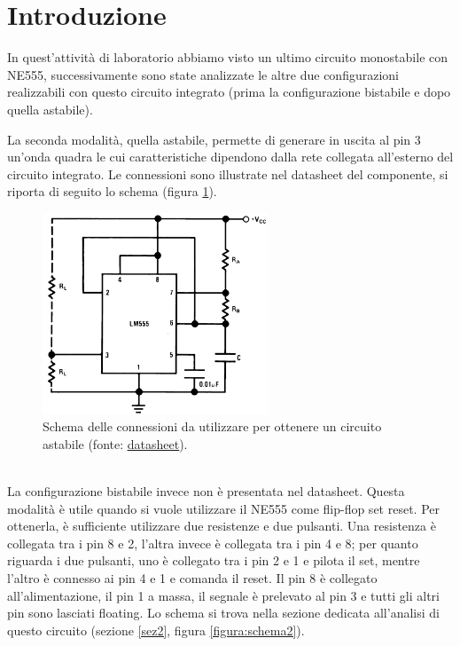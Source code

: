 \documentclass{report}
\begin{document}
\section*{Introduzione}
In quest'attività di laboratorio abbiamo visto un ultimo circuito monostabile con NE555, successivamente sono state analizzate le altre due configurazioni realizzabili con questo circuito integrato (prima la configurazione bistabile e dopo quella astabile).  \par
La seconda modalità, quella astabile, permette di generare in uscita al pin 3 un'onda quadra le cui caratteristiche dipendono dalla rete collegata all'esterno del circuito integrato. Le connessioni sono illustrate nel datasheet del componente, si riporta di seguito lo schema (figura \ref{figura:datasheet1}).
\begin{figure}[h!]
	\centering
	\includegraphics[height=6cm]{immagini/datasheet1}
	\caption{Schema delle connessioni da utilizzare per ottenere un circuito astabile (fonte: \textcolor{blue}{\underline{\href{https://www.ti.com/lit/ds/symlink/lm555.pdf?ts=1667144089940&ref_url=https\%253A\%252F\%252Fwww.ti.com\%252Fproduct\%252FLM555}{datasheet}}}).} %
	\label{figura:datasheet1}
\end{figure}
\\ La configurazione bistabile invece non è presentata nel datasheet. Questa modalità è utile quando si vuole utilizzare il NE555 come flip-flop set reset. Per ottenerla, è sufficiente utilizzare due resistenze e due pulsanti. Una resistenza è collegata tra i pin 8 e 2, l'altra invece è collegata tra i pin 4 e 8; per quanto riguarda i due pulsanti, uno è collegato tra i pin 2 e 1 e pilota il set, mentre l'altro è connesso ai pin 4 e 1 e comanda il reset. Il pin 8 è collegato all'alimentazione, il pin 1 a massa, il segnale è prelevato al pin 3 e tutti gli altri pin sono lasciati floating. Lo schema si trova nella sezione dedicata all'analisi di questo circuito (sezione \ref{sez2}, figura \ref{figura:schema2}).
\end{document}
